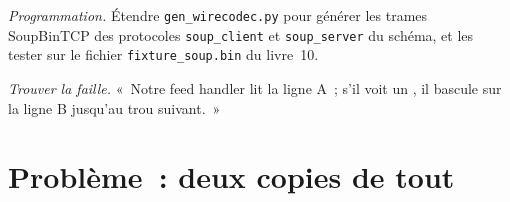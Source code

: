 \begin{exercise}[$\star\star\star$]\label{exo:ll:protocols-ii-binary-exchange-protocols:7}
\emph{Programmation.} Étendre \texttt{gen\_wirecodec.py} pour générer les trames SoupBinTCP des protocoles \texttt{soup\_client} et
\texttt{soup\_server} du schéma, et les tester sur le fichier \texttt{fixture\_soup.bin} du livre~10.
\end{exercise}

\begin{exercise}[$\star\star\star$]\label{exo:ll:protocols-ii-binary-exchange-protocols:8}
\emph{Trouver la faille.} «~Notre feed handler lit la ligne A~; s'il voit un , il bascule sur la ligne B jusqu'au trou suivant.~»
\end{exercise}

\section{Problème~: deux copies de tout}

